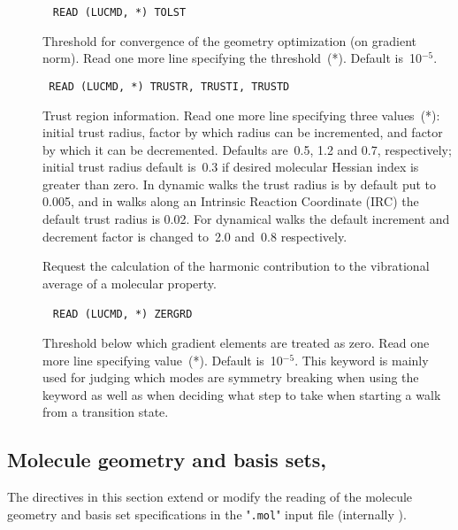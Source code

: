 \begin{description}
\item[]\verb| |\newline
\verb|READ (LUCMD, *) TOLST|

Threshold for convergence of the geometry optimization (on gradient
norm).  Read one more line specifying the threshold~(*).  Default
is~10$^{-5}$.

\item[]\verb| |\newline
\verb|READ (LUCMD, *) TRUSTR, TRUSTI, TRUSTD|

Trust region information.  Read one more
line specifying three values~(*): initial trust radius, factor by
which radius can be incremented, and factor by which it can be
decremented.  Defaults are~0.5, 1.2 and 0.7, respectively; initial
trust radius default is~0.3 if desired molecular Hessian index is
greater than zero. In dynamic walks the trust radius
is by default put
to 0.005, and in walks along an Intrinsic Reaction Coordinate
(IRC) the
default trust radius is 0.02. For dynamical walks the default
increment and decrement factor is changed to~2.0 and~0.8
respectively.

\item[]
Request the calculation of the harmonic contribution to the
vibrational average of a molecular property.


\item[]\verb| |\newline
\verb|READ (LUCMD, *) ZERGRD|

Threshold below which gradient elements are
treated as zero.  Read one more line specifying value~(*). Default
is~10$^{-5}$. This keyword is mainly used for judging which modes are
symmetry breaking when using the keyword  as well as
when deciding what step to take when starting a walk from a transition
state.
\end{description}

\subsection{Molecule geometry and basis sets, }\label{sec:herrdn}

The directives in this section extend or modify the reading of the molecule geometry and basis set
specifications in the "\verb|.mol|" input file (internally \molinp).

